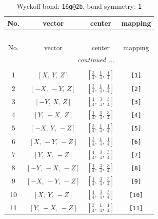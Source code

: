 \documentclass[fleqn,8pt]{jsarticle}
\begin{document}
\begin{longtable}{cccc}
\caption{Wyckoff bond: {\tt 16g@2b}, bond symmetry: {\tt 1}}
 \\
 \hline \hline
No. & vector & center & mapping \\ \hline \endfirsthead

\multicolumn{3}{l}{\tablename\ \thetable{}} \\
 \hline \hline
No. & vector & center & mapping \\ \hline \endhead

 \hline \hline
\multicolumn{3}{r}{\footnotesize\it continued ...} \\ \endfoot

 \hline \hline
\multicolumn{3}{r}{} \\ \endlastfoot

1 & $\left[ X,\, Y,\, Z \right]$ & $\left[ \frac{3}{4},\, \frac{1}{4},\, \frac{1}{4} \right]$ & {\tt [1]} \\ \hline
2 & $\left[ - X,\, - Y,\, Z \right]$ & $\left[ \frac{3}{4},\, \frac{1}{4},\, \frac{1}{4} \right]$ & {\tt [2]} \\ \hline
3 & $\left[ - Y,\, X,\, Z \right]$ & $\left[ \frac{1}{4},\, \frac{3}{4},\, \frac{3}{4} \right]$ & {\tt [3]} \\ \hline
4 & $\left[ Y,\, - X,\, Z \right]$ & $\left[ \frac{1}{4},\, \frac{3}{4},\, \frac{3}{4} \right]$ & {\tt [4]} \\ \hline
5 & $\left[ - X,\, Y,\, - Z \right]$ & $\left[ \frac{3}{4},\, \frac{1}{4},\, \frac{1}{4} \right]$ & {\tt [5]} \\ \hline
6 & $\left[ X,\, - Y,\, - Z \right]$ & $\left[ \frac{3}{4},\, \frac{1}{4},\, \frac{1}{4} \right]$ & {\tt [6]} \\ \hline
7 & $\left[ Y,\, X,\, - Z \right]$ & $\left[ \frac{1}{4},\, \frac{3}{4},\, \frac{3}{4} \right]$ & {\tt [7]} \\ \hline
8 & $\left[ - Y,\, - X,\, - Z \right]$ & $\left[ \frac{1}{4},\, \frac{3}{4},\, \frac{3}{4} \right]$ & {\tt [8]} \\ \hline
9 & $\left[ - X,\, - Y,\, - Z \right]$ & $\left[ \frac{1}{4},\, \frac{3}{4},\, \frac{3}{4} \right]$ & {\tt [9]} \\ \hline
10 & $\left[ X,\, Y,\, - Z \right]$ & $\left[ \frac{1}{4},\, \frac{3}{4},\, \frac{3}{4} \right]$ & {\tt [10]} \\ \hline
11 & $\left[ Y,\, - X,\, - Z \right]$ & $\left[ \frac{3}{4},\, \frac{1}{4},\, \frac{1}{4} \right]$ & {\tt [11]} \\ \hline

\end{longtable}
\end{document}
